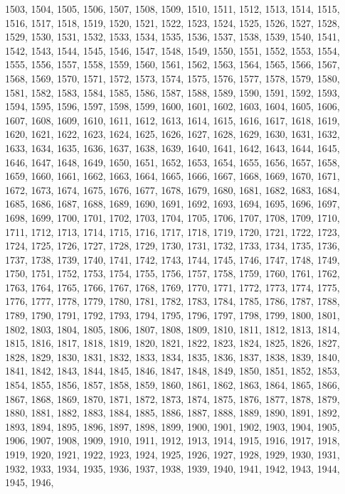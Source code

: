 \documentclass[a4paper,11pt]{article}
\numberwithin{equation}{section}
\begin{document}
1503, 1504, 1505, 1506, 1507, 1508, 1509, 1510, 1511, 1512, 1513, 1514,
1515, 1516, 1517, 1518, 1519, 1520, 1521, 1522, 1523, 1524, 1525, 1526,
1527, 1528, 1529, 1530, 1531, 1532, 1533, 1534, 1535, 1536, 1537, 1538,
1539, 1540, 1541, 1542, 1543, 1544, 1545, 1546, 1547, 1548, 1549, 1550,
1551, 1552, 1553, 1554, 1555, 1556, 1557, 1558, 1559, 1560, 1561, 1562,
1563, 1564, 1565, 1566, 1567, 1568, 1569, 1570, 1571, 1572, 1573, 1574,
1575, 1576, 1577, 1578, 1579, 1580, 1581, 1582, 1583, 1584, 1585, 1586,
1587, 1588, 1589, 1590, 1591, 1592, 1593, 1594, 1595, 1596, 1597, 1598,
1599, 1600, 1601, 1602, 1603, 1604, 1605, 1606, 1607, 1608, 1609, 1610,
1611, 1612, 1613, 1614, 1615, 1616, 1617, 1618, 1619, 1620, 1621, 1622,
1623, 1624, 1625, 1626, 1627, 1628, 1629, 1630, 1631, 1632, 1633, 1634,
1635, 1636, 1637, 1638, 1639, 1640, 1641, 1642, 1643, 1644, 1645, 1646,
1647, 1648, 1649, 1650, 1651, 1652, 1653, 1654, 1655, 1656, 1657, 1658,
1659, 1660, 1661, 1662, 1663, 1664, 1665, 1666, 1667, 1668, 1669, 1670,
1671, 1672, 1673, 1674, 1675, 1676, 1677, 1678, 1679, 1680, 1681, 1682,
1683, 1684, 1685, 1686, 1687, 1688, 1689, 1690, 1691, 1692, 1693, 1694,
1695, 1696, 1697, 1698, 1699, 1700, 1701, 1702, 1703, 1704, 1705, 1706,
1707, 1708, 1709, 1710, 1711, 1712, 1713, 1714, 1715, 1716, 1717, 1718,
1719, 1720, 1721, 1722, 1723, 1724, 1725, 1726, 1727, 1728, 1729, 1730,
1731, 1732, 1733, 1734, 1735, 1736, 1737, 1738, 1739, 1740, 1741, 1742,
1743, 1744, 1745, 1746, 1747, 1748, 1749, 1750, 1751, 1752, 1753, 1754,
1755, 1756, 1757, 1758, 1759, 1760, 1761, 1762, 1763, 1764, 1765, 1766,
1767, 1768, 1769, 1770, 1771, 1772, 1773, 1774, 1775, 1776, 1777, 1778,
1779, 1780, 1781, 1782, 1783, 1784, 1785, 1786, 1787, 1788, 1789, 1790,
1791, 1792, 1793, 1794, 1795, 1796, 1797, 1798, 1799, 1800, 1801, 1802,
1803, 1804, 1805, 1806, 1807, 1808, 1809, 1810, 1811, 1812, 1813, 1814,
1815, 1816, 1817, 1818, 1819, 1820, 1821, 1822, 1823, 1824, 1825, 1826,
1827, 1828, 1829, 1830, 1831, 1832, 1833, 1834, 1835, 1836, 1837, 1838,
1839, 1840, 1841, 1842, 1843, 1844, 1845, 1846, 1847, 1848, 1849, 1850,
1851, 1852, 1853, 1854, 1855, 1856, 1857, 1858, 1859, 1860, 1861, 1862,
1863, 1864, 1865, 1866, 1867, 1868, 1869, 1870, 1871, 1872, 1873, 1874,
1875, 1876, 1877, 1878, 1879, 1880, 1881, 1882, 1883, 1884, 1885, 1886,
1887, 1888, 1889, 1890, 1891, 1892, 1893, 1894, 1895, 1896, 1897, 1898,
1899, 1900, 1901, 1902, 1903, 1904, 1905, 1906, 1907, 1908, 1909, 1910,
1911, 1912, 1913, 1914, 1915, 1916, 1917, 1918, 1919, 1920, 1921, 1922,
1923, 1924, 1925, 1926, 1927, 1928, 1929, 1930, 1931, 1932, 1933, 1934,
1935, 1936, 1937, 1938, 1939, 1940, 1941, 1942, 1943, 1944, 1945, 1946,
\end{document}
